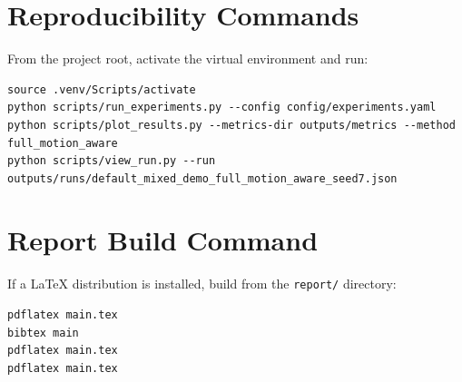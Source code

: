 ﻿\documentclass[11pt]{article}
\begin{document}
\appendix
\section{Reproducibility Commands}
From the project root, activate the virtual environment and run:
\begin{verbatim}
source .venv/Scripts/activate
python scripts/run_experiments.py --config config/experiments.yaml
python scripts/plot_results.py --metrics-dir outputs/metrics --method full_motion_aware
python scripts/view_run.py --run outputs/runs/default_mixed_demo_full_motion_aware_seed7.json
\end{verbatim}

\section{Report Build Command}
If a LaTeX distribution is installed, build from the \texttt{report/} directory:
\begin{verbatim}
pdflatex main.tex
bibtex main
pdflatex main.tex
pdflatex main.tex
\end{verbatim}



\end{document}
